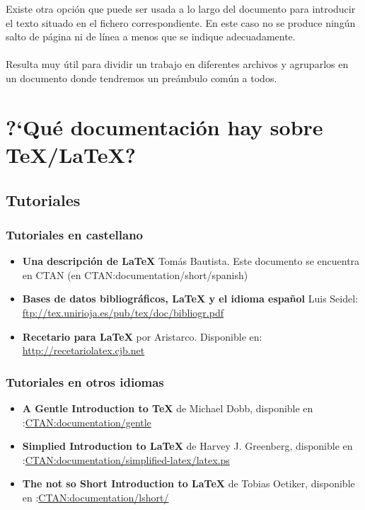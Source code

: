 		Existe otra opci\'on que puede ser usada a lo largo del documento para introducir el texto situado en el 
		fichero correspondiente. En este caso no se produce ning\'un salto de p\'agina ni de l\'inea a menos que se indique 
		adecuadamente.\\
				\verb++\\
		Resulta muy \'util para dividir un trabajo en diferentes archivos y agruparlos en un documento donde tendremos 
		un pre\'ambulo com\'un a todos. 
					 	

\section{?`Qu\'e documentaci\'on hay sobre \TeX{}/\LaTeX{}?}
	\subsection{Tutoriales}%
 	\subsubsection{Tutoriales en castellano}
								
	\begin{itemize}
	\item \textbf{Una descripci\'on de \LaTeX{}} Tom\'as Bautista. Este documento se encuentra en CTAN (en 
 	CTAN:documentation/short/spanish)
					
	\item \textbf{Bases de datos bibliogr\'aficos, \LaTeX{} y el idioma espa\~nol} Luis Seidel:
         \url{ftp://tex.unirioja.es/pub/tex/doc/bibliogr.pdf}
					
	\item \textbf{Recetario para \LaTeX{}} por Aristarco. Disponible en:\\
	\url{http://recetariolatex.cjb.net}

	\end{itemize}
 				
 	\subsubsection{Tutoriales en otros idiomas}%
 										
	\begin{itemize}
	\item \textbf{A Gentle Introduction to \TeX{}} de Michael Dobb, 
	disponible en :\url{CTAN:documentation/gentle}

	\item \textbf{Simplied Introduction to \LaTeX{}} de Harvey J. Greenberg,
	disponible en :\url{CTAN:documentation/simplified-latex/latex.ps}
															
	\item \textbf{The not so Short Introduction to \LaTeX{}} de Tobias Oetiker,
	disponible en :\url{CTAN:documentation/lshort/} 
					
								\end{itemize}
 		
